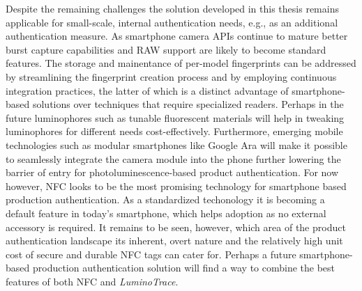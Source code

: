 \documentclass[thesis.tex]{subfiles}
\begin{document}
Despite the remaining challenges the solution developed in this thesis remains applicable for small-scale, internal authentication needs, e.g., as an additional authentication measure. As smartphone camera APIs continue to mature better burst capture capabilities and RAW support are likely to become standard features. The storage and mainentance of per-model fingerprints can be addressed by streamlining the fingerprint creation process and by employing continuous integration practices, the latter of which is a distinct advantage of smartphone-based solutions over techniques that require specialized readers. Perhaps in the future luminophores such as tunable fluorescent materials will help in tweaking luminophores for different needs cost-effectively. Furthermore, emerging mobile technologies such as modular smartphones like Google Ara will make it possible to seamlessly integrate the camera module into the phone further lowering the barrier of entry for photoluminescence-based product authentication. For now however, NFC looks to be the most promising technology for smartphone based production authentication. As a standardized techonology it is becoming a default feature in today's smartphone, which helps adoption as no external accessory is required. It remains to be seen, however, which area of the product authentication landscape its inherent, overt nature and the relatively high unit cost of secure and durable NFC tags can cater for. Perhaps a future smartphone-based production authentication solution will find a way to combine the best features of both NFC and \emph{LuminoTrace}.
\end{document}
